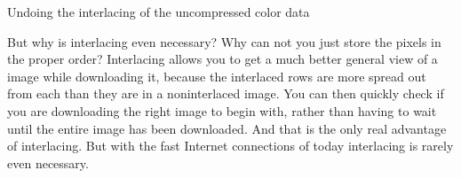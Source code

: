 \begin{algorithm}[H]
  \caption{Undoing the interlacing of the uncompressed \gif color data}
  \label{alg:gif-interlace}
  \begin{algorithmic}[1]






    \EndWhile


    \EndWhile

    \EndWhile

  \end{algorithmic}
\end{algorithm}

But why is interlacing even necessary? Why can not you just store the
pixels in the proper order? Interlacing allows you to get a much
better general view of a \gif image while downloading it, because the
interlaced rows are more spread out from each than they are in a
noninterlaced image. You can then quickly check if you are downloading
the right image to begin with, rather than having to wait until the
entire image has been downloaded. And that is the only real advantage
of interlacing. But with the fast Internet connections of today
interlacing is rarely even necessary.


